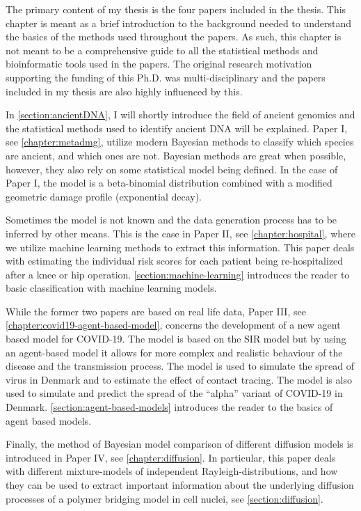 The primary content of my thesis is the four papers included in the thesis. This chapter is meant as a brief introduction to the background needed to understand the basics of the methods used throughout the papers. As such, this chapter is not meant to be a comprehensive guide to all the statistical methods and bioinformatic tools used in the papers. The original research motivation supporting the funding of this Ph.D. was multi-disciplinary and the papers included in my thesis are also highly influenced by this.

In \autoref{section:ancientDNA}, I will shortly introduce the field of ancient genomics and the statistical methods used to identify ancient DNA will be explained. Paper I, see \autoref{chapter:metadmg}, utilize modern Bayesian methods to classify which species are ancient, and which ones are not. Bayesian methods are great when possible, however, they also rely on some statistical model being defined. In the case of Paper I, the model is a beta-binomial distribution combined with a modified geometric damage profile (exponential decay).

Sometimes the model is not known and the data generation process has to be inferred by other means. This is the case in Paper II, see \autoref{chapter:hospital}, where we utilize machine learning methods to extract this information. This paper deals with estimating the individual risk scores for each patient being re-hospitalized after a knee or hip operation. \autoref{section:machine-learning} introduces the reader to basic classification with machine learning models.

While the former two papers are based on real life data, Paper III, see \autoref{chapter:covid19-agent-based-model}, concerns the development of a new agent based model for COVID-19. The model is based on the SIR model but by using an agent-based model it allows for more complex and realistic behaviour of the disease and the transmission process. The model is used to simulate the spread of virus in Denmark and to estimate the effect of contact tracing. The model is also used to simulate and predict the spread of the ``alpha'' variant of COVID-19 in Denmark. \autoref{section:agent-based-models} introduces the reader to the basics of agent based models.

Finally, the method of Bayesian model comparison of different diffusion models is introduced in Paper IV, see \autoref{chapter:diffusion}. In particular, this paper deals with different mixture-models of independent Rayleigh-distributions, and how they can be used to extract important information about the underlying diffusion processes of a polymer bridging model in cell nuclei, see \autoref{section:diffusion}.

